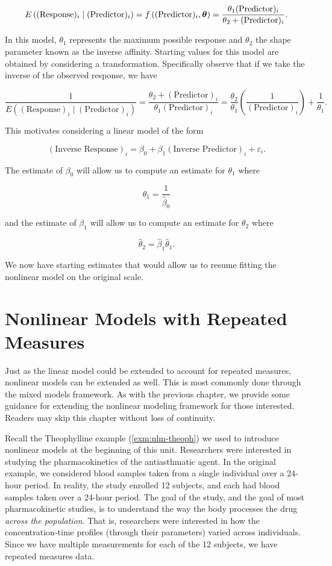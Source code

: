 \documentclass[
]{book}
\theoremstyle{plain}
\theoremstyle{mydefn}
\theoremstyle{myexmpl}
\theoremstyle{remark}
\begin{document}
\[E\left((\text{Response})_i \mid (\text{Predictor})_i\right) = f\left((\text{Predictor})_i, \boldsymbol{\theta}\right) = \frac{\theta_1 (\text{Predictor})_i}{\theta_2 + (\text{Predictor})_i}.\]

In this model, \(\theta_1\) represents the maximum possible response and \(\theta_2\) the shape parameter known as the inverse affinity. Starting values for this model are obtained by considering a transformation. Specifically observe that if we take the inverse of the observed response, we have

\[\frac{1}{E\left((\text{Response})_i \mid (\text{Predictor})_i\right)} = \frac{\theta_2 + (\text{Predictor})_i}{\theta_1 (\text{Predictor})_i} = \frac{\theta_2}{\theta_1} \left(\frac{1}{(\text{Predictor})_i}\right) + \frac{1}{\theta_1}.\]

This motivates considering a linear model of the form

\[(\text{Inverse Response})_i = \beta_0 + \beta_1 (\text{Inverse Predictor})_i + \varepsilon_i.\]

The estimate of \(\beta_0\) will allow us to compute an estimate for \(\theta_1\) where

\[\widehat{\theta}_1 = \frac{1}{\widehat{\beta}_0}\]

and the estimate of \(\beta_1\) will allow us to compute an estimate for \(\theta_2\) where

\[\widehat{\theta}_2 = \widehat{\beta}_1 \widehat{\theta}_1.\]

We now have starting estimates that would allow us to resume fitting the nonlinear model on the original scale.

\hypertarget{nlm-rm}{%
\chapter{Nonlinear Models with Repeated Measures}\label{nlm-rm}}

Just as the linear model could be extended to account for repeated measures, nonlinear models can be extended as well. This is most commonly done through the mixed models framework. As with the previous chapter, we provide some guidance for extending the nonlinear modeling framework for those interested. Readers may skip this chapter without loss of continuity.

Recall the Theophylline example (\ref{exm:nlm-theoph}) we used to introduce nonlinear models at the beginning of this unit. Researchers were interested in studying the pharmacokinetics of the antiasthmatic agent. In the original example, we considered blood samples taken from a single individual over a 24-hour period. In reality, the study enrolled 12 subjects, and each had blood samples taken over a 24-hour period. The goal of the study, and the goal of most pharmacokinetic studies, is to understand the way the body processes the drug \emph{across the population}. That is, researchers were interested in how the concentration-time profiles (through their parameters) varied across individuals. Since we have multiple measurements for each of the 12 subjects, we have repeated measures data.
\end{document}
